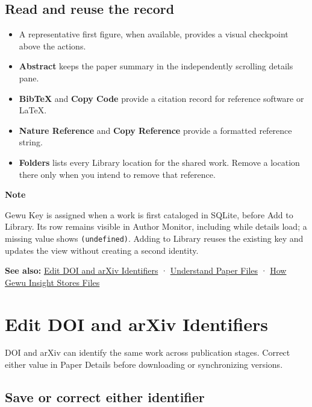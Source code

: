 \documentclass[10pt,letterpaper,oneside]{scrreprt}
\providecommand{\tightlist}{\setlength{\itemsep}{1pt}\setlength{\parskip}{0pt}}
\newenvironment{GewuRelated}{\par\nobreak\vspace{3pt}\nobreak\begingroup\small\sffamily\begin{samepage}\noindent}{\par\end{samepage}\endgroup}
\newenvironment{GewuLead}
  {\begin{list}{}{\leftmargin=0pt\rightmargin=0pt\topsep=0pt\partopsep=0pt\parsep=0pt}\item\relax
    \sffamily\fontsize{10.5}{13.2}\selectfont\color{GewuMuted}}
  {\end{list}}
\renewenvironment{quote}
  {\Needspace{5\baselineskip}\begin{tcolorbox}[enhanced,breakable,colback=GewuPale,colframe=GewuPale,boxrule=0pt,
    borderline west={1.6pt}{0pt}{GewuBlue},arc=1.2mm,left=2.5mm,right=2.5mm,top=1.7mm,bottom=1.7mm,
    before skip=4pt,after skip=5pt,fontupper=\color{GewuInk}\small]}
  {\end{tcolorbox}}
\begin{document}
\subsection{Read and reuse the record}\label{read-and-reuse-the-record}

\begin{itemize}
\tightlist
\item
  A representative first figure, when available, provides a visual checkpoint above the actions.
\item
  \textbf{Abstract} keeps the paper summary in the independently scrolling details pane.
\item
  \textbf{BibTeX} and \textbf{Copy Code} provide a citation record for reference software or LaTeX.
\item
  \textbf{Nature Reference} and \textbf{Copy Reference} provide a formatted reference string.
\item
  \textbf{Folders} lists every Library location for the shared work. Remove a location there only when you intend to remove that reference.
\end{itemize}

\begin{quote}
\textbf{Note}

Gewu Key is assigned when a work is first cataloged in SQLite, before Add to Library. Its row remains visible in Author Monitor, including while details load; a missing value shows \texttt{(undefined)}. Adding to Library reuses the existing key and updates the view without creating a second identity.
\end{quote}

\begin{GewuRelated}
\textbf{See also:} \hyperref[identifiers]{Edit DOI and arXiv Identifiers} · \hyperref[paper-files]{Understand Paper Files} · \hyperref[storage-model]{How Gewu Insight Stores Files}
\end{GewuRelated}

\section{Edit DOI and arXiv Identifiers}\label{identifiers}

\begin{GewuLead}
DOI and arXiv can identify the same work across publication stages. Correct either value in Paper Details before downloading or synchronizing versions.
\end{GewuLead}

\subsection{Save or correct either identifier}\label{save-or-correct-either-identifier}
\end{document}
